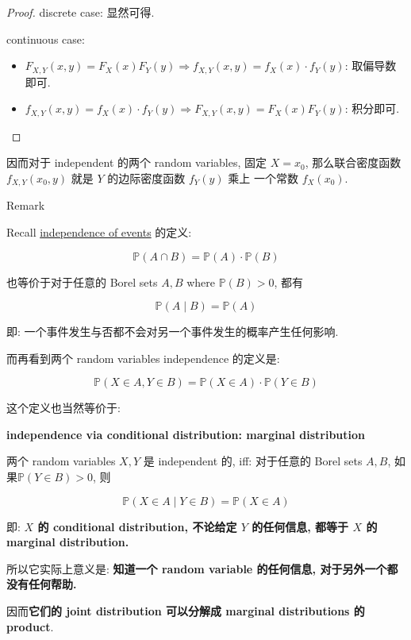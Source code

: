 \documentclass{qlnotes-export}
\begin{document}
\begin{proof}

discrete case: 显然可得.

continuous case:

\begin{itemize}
\item
  \(F_{X,Y}(x,y) = F_{X}(x)F_{Y}(y)\Longrightarrow f_{X,Y}(x,y) = f_{X}(x) \cdot f_{Y}(y)\): 取偏导数即可.
\item
  \(f_{X,Y}(x,y) = f_{X}(x) \cdot f_{Y}(y)\Longrightarrow F_{X,Y}(x,y) = F_{X}(x)F_{Y}(y)\): 积分即可.
\end{itemize}

\end{proof}

因而对于 independent 的两个 random variables, 固定 \(X = x_{0}\), 那么联合密度函数 \(f_{X,Y}(x_{0},y)\) 就是 \(Y\) 的边际密度函数 \(f_{Y}(y)\) 乘上 一个常数 \(f_{X}(x_{0})\).\\

\begin{qlremark}{Remark}

Recall \href{https://qiulinfan.github.io/notes/math/probability/\#kn-independence-of-events}{independence of events} 的定义:

\[{\mathbb{P}}(A \cap B) = {\mathbb{P}}(A) \cdot {\mathbb{P}}(B)\]

也等价于对于任意的 Borel sets \(A,B\) where \({\mathbb{P}}(B) > 0\), 都有

\[{\mathbb{P}}(A \mid B) = {\mathbb{P}}(A)\]

即: 一个事件发生与否都不会对另一个事件发生的概率产生任何影响.

而再看到两个 random variables independence 的定义是:

\[{\mathbb{P}}(X \in A,Y \in B) = {\mathbb{P}}(X \in A) \cdot {\mathbb{P}}(Y \in B)\]

这个定义也当然等价于:

\begin{proposition}{\protect{}\label{kn-independence-via-conditional-distribution}{\textbf{independence
via conditional distribution: marginal distribution}}}

两个 random variables \(X,Y\) 是 independent 的, iff: 对于任意的 Borel sets \(A,B\), 如果\({\mathbb{P}}(Y \in B) > 0\), 则

\[{\mathbb{P}}(X \in A \mid Y \in B) = {\mathbb{P}}(X \in A)\]

即: \textbf{\(X\) 的 conditional distribution, 不论给定 \(Y\) 的任何信息, 都等于 \(X\) 的 marginal distribution.}

\end{proposition}

所以它实际上意义是: \textbf{知道一个 random variable 的任何信息, 对于另外一个都没有任何帮助.}

因而\textbf{它们的 joint distribution 可以分解成 marginal distributions 的 product}.\\

\end{qlremark}
\end{document}
